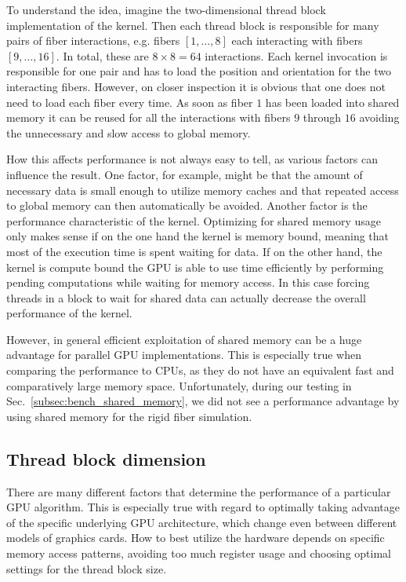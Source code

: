 To understand the idea, imagine the two-dimensional thread block implementation of the kernel. Then each thread block is responsible for many pairs of fiber interactions, e.g. fibers $[1,\dots,8]$ each interacting with fibers $[9,\dots,16]$. In total, these are $8 \times 8 = 64$ interactions. Each kernel invocation is responsible for one pair and has to load the position and orientation for the two interacting fibers. However, on closer inspection it is obvious that one does not need to load each fiber every time. As soon as fiber $1$ has been loaded into shared memory it can be reused for all the interactions with fibers $9$ through $16$ avoiding the unnecessary and slow access to global memory.

How this affects performance is not always easy to tell, as various factors can influence the result. One factor, for example, might be that the amount of necessary data is small enough to utilize memory caches and that repeated access to global memory can then automatically be avoided. Another factor is the performance characteristic of the kernel. Optimizing for shared memory usage only makes sense if on the one hand the kernel is memory bound, meaning that most of the execution time is spent waiting for data. If on the other hand, the kernel is compute bound the GPU is able to use time efficiently by performing pending computations while waiting for memory access. In this case forcing threads in a block to wait for shared data can actually decrease the overall performance of the kernel.

However, in general efficient exploitation of shared memory can be a huge advantage for parallel GPU implementations. This is especially true when comparing the performance to CPUs, as they do not have an equivalent fast and comparatively large memory space. Unfortunately, during our testing in Sec.~\ref{subsec:bench_shared_memory}, we did not see a performance advantage by using shared memory for the rigid fiber simulation.

\subsection{Thread block dimension}
\label{subsec:parallel_thread_block}

There are many different factors that determine the performance of a particular GPU algorithm. This is especially true with regard to optimally taking advantage of the specific underlying GPU architecture, which change even between different models of graphics cards. How to best utilize the hardware depends on specific memory access patterns, avoiding too much register usage and choosing optimal settings for the thread block size.

